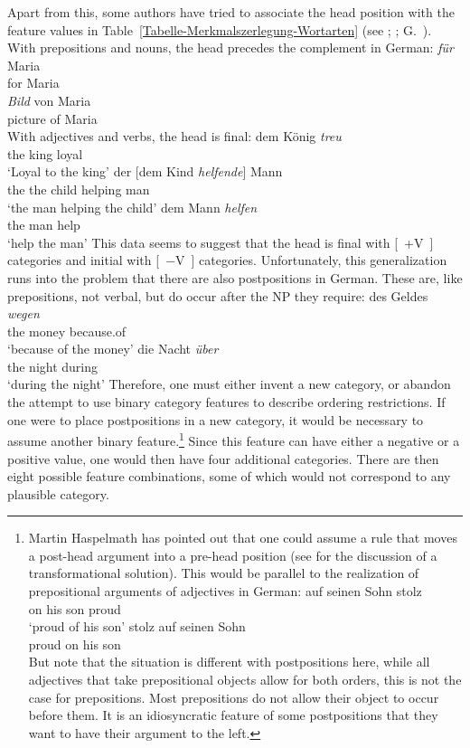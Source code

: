 Apart from this, some authors have tried to associate the head position with the feature values in Table~\ref{Tabelle-Merkmalszerlegung-Wortarten} (see \eg \citealp[]{Grewendorf88a};
\citealp[]{Haftka96a}; G.\ \citealp[]{GMueller2011a}). With prepositions and nouns,
the head precedes the complement in German:
\eal
\ex
\gll \emph{für} Maria\\
     for Maria\\
\ex 
\gll \emph{Bild} von Maria\\
	 picture of Maria\\
\zl
With adjectives and verbs, the head is final:
\eal
\ex 
\gll dem König \emph{treu}\\
     the king loyal\\
\glt `Loyal to the king'
\ex 
\gll der [dem Kind \emph{helfende}] Mann\\
     the the child helping man\\
\glt `the man helping the child'
\ex 
\gll dem Mann \emph{helfen}\\
     the man help\\
\glt `help the man'
\zl
This data seems to suggest that the head is final with [~+V~] categories and initial with [~$-$V~] categories. Unfortunately, this
generalization runs into the problem that there are also postpositions in German. These are, like
prepositions, not verbal, but do occur after the NP they require: 
\eal
\ex 
\gll des Geldes \emph{wegen}\\
     the money because.of\\
\glt `because of the money'
\ex 
\gll die Nacht \emph{über}\\
     the night during\\
\glt `during the night'
\zl
Therefore, one must either invent a new category, or abandon the attempt to use binary category features to describe ordering restrictions.
If one were to place postpositions in a new category, it would be necessary to assume another binary
feature.\footnote{%
Martin Haspelmath has pointed out that one could assume a rule that moves a
post-head argument into a pre-head position (see \citealp[]{Riemsdijk78a} for the discussion
of a transformational solution). This would be parallel to the realization of
prepositional arguments of adjectives in German:
\eal
\ex
\gll auf seinen Sohn stolz\\
     on  his son proud\\
\glt `proud of his son'
\ex 
\gll stolz auf seinen Sohn\\
     proud on  his    son\\
\zl
But note that the situation is different with postpositions here, while all adjectives that take
prepositional objects allow for both orders, this is not the case for prepositions. Most
prepositions do not allow their object to occur before them. It is an idiosyncratic feature of some
postpositions that they want to have their argument to the left.%
} 
Since this feature can have either a negative or a positive value, one would then have four
additional categories. There are then eight possible feature combinations, some of which would not
correspond to any plausible category.

